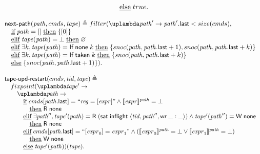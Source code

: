 {\[\begin{array}{l}
\quad \text{\underline{else}} \; true. \\
\end{array}
\]

\[
\begin{array}{l}
\nextPathCom{\cpath}{\Carm}{\tape} \triangleq filter(\lambda \cpath' \rightarrow \lastInstr{\cpath'} < size(\Carm),  \\
\quad \textIf \cpath = [] \; \textThen \{ [0] \} \\
\quad \textElif \tape(\cpath) = \bot \; \textThen \emptyset \\
\quad \textElif \exists k, \tape(\cpath) = \tapeIfGoto{\None}{k} \; \textThen
      \{ snoc(\cpath, \lastInstr{\cpath} + 1), snoc(\cpath, \lastInstr{\cpath} + k) \} \\
\quad \textElif \exists k, \tape(\cpath) = \tapeIfGoto{\Taken}{k} \; \textThen
      \{ snoc(\cpath, \lastInstr{\cpath} + k) \} \\
\quad \textElse \{ snoc(\cpath, \lastInstr{\cpath} + 1) \}). \\
\end{array}
\]

\[
\begin{array}{l}
\tapeUpdRestart(\Carm, \tId, \tape) \triangleq \\
\quad fixpoint(\lambda \tape' -> \\
\qquad \lambda \cpath -> \\
\qquad \quad \textIf \Carm[\lastInstr{\cpath}] = ``\reg = [\expr]" \land \semf{\expr}{\cpath} = \bot \\
\qquad \qquad \textThen \tapeRead{\None} \\
\qquad \quad \textElif \exists \cpath'',
                  \tape'(\cpath) = \tapeRead{(\tapeSatisfied{\SatisfiedInFlight}{\stRequestWrite{\tId}{ \cpath''}{ \_}{\_}})} \land
                  \tape'(\cpath'') = \tapeWrite{\None} \\
\qquad \qquad \textThen \tapeRead{\None} \\
\qquad \quad \textElif \Carm[\lastInstr{\cpath}] = ``[\expr_0] = \expr_1" \land
                  (\semf{\expr_0}{\cpath} = \bot \lor \semf{\expr_1}{\cpath} = \bot) \\
\qquad \qquad \textThen \tapeWrite{\None} \\
\qquad \quad \textElse \tape'(\cpath))(\tape). \\
\end{array}
\]

}
